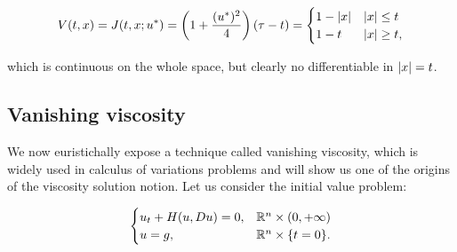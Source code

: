 







\begin{equation}\label{Non diff V-V}V(t,x)=J(t,x;u^{\ast}) = \left(1+\frac{(u^{\ast})^2}{4}\right)(\tau - t) = \begin{cases}
    1-\abs{x} & \abs{x}\leq t \\
    1-t& \abs{x}\geq t,
\end{cases}\end{equation}

which is continuous on the whole space, but clearly no differentiable in $\abs{x}=t$.

\subsection{Vanishing viscosity}

We now euristichally expose a technique called vanishing viscosity, which is widely used in 
calculus of variations problems and will show us one of the origins of the viscosity 
solution notion. Let us consider the initial value problem:

\begin{equation}\label{4-1-fullynonlinear}
    \begin{cases}
        u_t + H(u,Du) = 0,& \mathbb{R}^n\times(0,+\infty) \\
        u = g,& \mathbb{R}^n\times\{t=0\}.
    \end{cases}
\end{equation}

